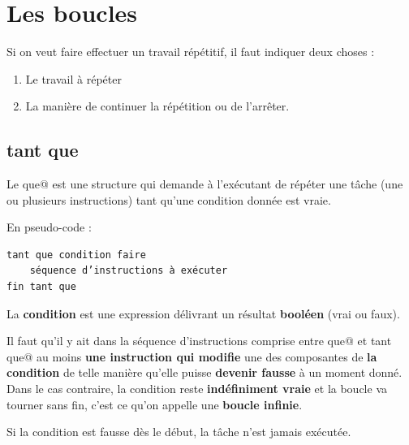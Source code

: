 \documentclass[11pt,a4paper]{article}
\begin{document}
            \section{Les boucles}
        Si on veut faire effectuer un travail r\'ep\'etitif, il faut indiquer deux choses :
        
					\begin{enumerate}
				
			\item Le travail \`a r\'ep\'eter
			\item La mani\`ere de continuer la r\'ep\'etition ou de l'arr\^eter.
					\end{enumerate}
				
            \par
        \subsection{tant que}
        Le \guillemotleft  \verb@tant que@ \guillemotright  est une structure 
        qui demande \`a l'ex\'ecutant de r\'ep\'eter une t\^ache (une ou
        plusieurs instructions) tant qu'une condition donn\'ee est vraie.
      
            \par
        En pseudo-code :
            \par
        \begin{verbatim}
tant que condition faire
    séquence d’instructions à exécuter
fin tant que
      \end{verbatim}
        La \textbf{condition} est une expression d\'elivrant un r\'esultat 
        \textbf{bool\'een} (vrai ou faux).
      
            \par
        
        Il faut qu'il y ait dans la s\'equence d'instructions comprise entre \verb@tant que@
        et \verb@fin tant que@ au moins \textbf{une instruction qui 
        modifie} une des composantes de \textbf{la condition}
        de telle mani\`ere qu'elle puisse \textbf{devenir fausse} \`a un moment donn\'e. Dans le cas contraire,
        la condition reste \textbf{ind\'efiniment vraie} et la boucle va tourner sans fin, c'est ce qu'on appelle
        une \textbf{boucle infinie}.
      
            \par
        
        Si la condition est fausse d\`es le d\'ebut, la t\^ache n'est jamais ex\'ecut\'ee.
      
\end{document}
